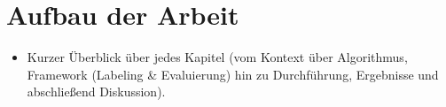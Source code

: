 \section{Aufbau der Arbeit}\label{sec:aufbau-der-arbeit}
\begin{itemize}
    \item Kurzer Überblick über jedes Kapitel (vom Kontext über Algorithmus, Framework (Labeling \& Evaluierung) hin zu Durchführung, Ergebnisse und abschließend Diskussion).
\end{itemize}